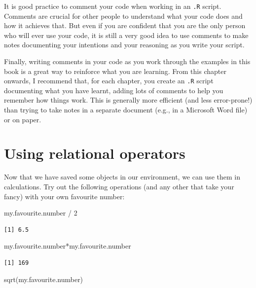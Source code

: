 \documentclass[
  letterpaper,
  DIV=11,
  numbers=noendperiod,
  oneside]{scrreprt}
\newenvironment{Shaded}{\begin{snugshade}}{\end{snugshade}}
\newcommand{\DecValTok}[1]{\textcolor[rgb]{0.68,0.00,0.00}{#1}}
\newcommand{\FunctionTok}[1]{\textcolor[rgb]{0.28,0.35,0.67}{#1}}
\newcommand{\NormalTok}[1]{\textcolor[rgb]{0.00,0.23,0.31}{#1}}
\newcommand{\SpecialCharTok}[1]{\textcolor[rgb]{0.37,0.37,0.37}{#1}}
\begin{document}
It is good practice to comment your code when working in an \texttt{.R}
script. Comments are crucial for other people to understand what your
code does and how it achieves that. But even if you are confident that
you are the only person who will ever use your code, it is still a very
good idea to use comments to make notes documenting your intentions and
your reasoning as you write your script.

Finally, writing comments in your code as you work through the examples
in this book is a great way to reinforce what you are learning. From
this chapter onwards, I recommend that, for each chapter, you create an
\texttt{.R} script documenting what you have learnt, adding lots of
comments to help you remember how things work. This is generally more
efficient (and less error-prone!) than trying to take notes in a
separate document (e.g., in a Microsoft Word file) or on paper.

\section{Using relational operators}\label{using-relational-operators}

Now that we have saved some objects in our environment, we can use them
in calculations. Try out the following operations (and any other that
take your fancy) with your own favourite number:

\begin{Shaded}
\begin{Highlighting}[]
\NormalTok{my.favourite.number }\SpecialCharTok{/} \DecValTok{2}
\end{Highlighting}
\end{Shaded}

\begin{verbatim}
[1] 6.5
\end{verbatim}

\begin{Shaded}
\begin{Highlighting}[]
\NormalTok{my.favourite.number}\SpecialCharTok{*}\NormalTok{my.favourite.number}
\end{Highlighting}
\end{Shaded}

\begin{verbatim}
[1] 169
\end{verbatim}

\begin{Shaded}
\begin{Highlighting}[]
\FunctionTok{sqrt}\NormalTok{(my.favourite.number)}
\end{Highlighting}
\end{Shaded}
\end{document}
